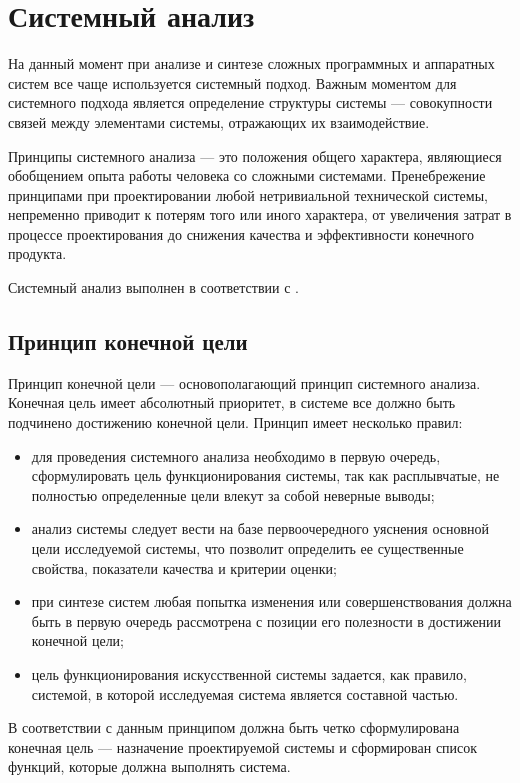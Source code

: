 \section{Системный анализ}

На данный момент при анализе и синтезе сложных программных и аппаратных систем все чаще используется системный подход.
Важным моментом для системного подхода является определение структуры системы --- совокупности связей между элементами системы, отражающих их взаимодействие.

Принципы системного анализа --- это положения общего характера, являющиеся обобщением опыта работы человека со сложными системами.
Пренебрежение принципами при проектировании любой нетривиальной технической системы, непременно приводит к потерям того или иного характера, от увеличения затрат в процессе проектирования до снижения качества и эффективности конечного продукта.

Системный анализ выполнен в соответствии с \cite{sys-analyz}.

\subsection{Принцип конечной цели} \label{goal}

Принцип конечной цели --- основополагающий принцип системного анализа.
Конечная цель имеет абсолютный приоритет, в системе все должно быть подчинено достижению конечной цели.
Принцип имеет несколько правил:
\begin{itemize}
  \item для проведения системного анализа необходимо в первую очередь, сформулировать цель функционирования системы, так как расплывчатые, не полностью определенные цели влекут за собой неверные выводы;
  \item анализ системы следует вести на базе первоочередного уяснения основной цели исследуемой системы, что позволит определить ее существенные свойства, показатели качества и критерии оценки;
  \item при синтезе систем любая попытка изменения или совершенствования должна быть в первую очередь рассмотрена с позиции его полезности в достижении конечной цели;
  \item цель функционирования искусственной системы задается, как правило, системой, в которой исследуемая система является составной частью.
\end{itemize}

В соответствии с данным принципом должна быть четко сформулирована конечная цель --- назначение проектируемой системы и сформирован список функций, которые должна выполнять система.

